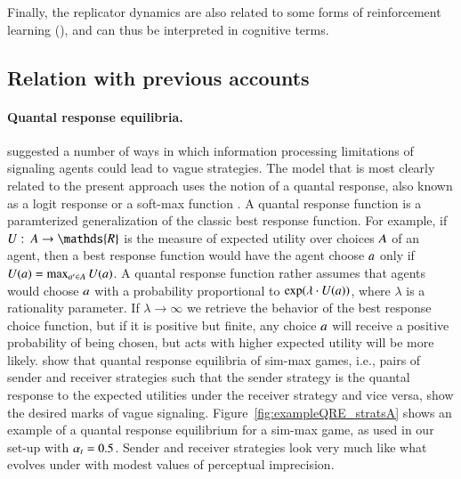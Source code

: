 Finally, the replicator dynamics are also related to some forms of reinforcement learning (\cite{Borgers1997,Hopkins2005,Beggs2005}), and can thus be interpreted in cognitive terms.


\subsection{Relation with previous accounts}

\paragraph{Quantal response equilibria.}
\citet{FrankeJager2010:Vagueness-Signa} suggested a number of ways in
which information processing limitations of signaling agents could
lead to vague strategies. The model that is most clearly related to
the present approach uses the notion of a quantal response, also known
as a logit response or a soft-max function
\citep[e.g.][]{Luce1959:Individual-Choi,McFadden1976:Quantal-Choice-,McKelveyPalfrey1995:Quantal-Respons,McKelveyPalfrey1998:Quantal-Respons,GoereeHolt2008:Quantal-Respons}. A
quantal response function is a paramterized generalization of the
classic best response function. For example, if $U \mycolon \Acts
\rightarrow \mathds{R}$ is the measure of expected utility over
choices $A$ of an agent, then a best response function would have
the agent choose $a$ only if $U(a) = \max_{a' \in A}
U(a)$. A quantal response function rather assumes that agents would
choose $a$ with a probability proportional to $\operatorname{exp}(\lambda \cdot
U(a))$, where $\lambda$ is a rationality parameter. If $\lambda
\rightarrow \infty$ we retrieve the behavior of the best response
choice function, but if it is positive but finite, any choice $a$
will receive a positive probability of being chosen, but acts with
higher expected utility will be more
likely. \citet{FrankeJager2010:Vagueness-Signa} show that quantal
response equilibria of sim-max games, i.e., pairs of sender and
receiver strategies such that the sender strategy is the quantal
response to the expected utilities under the receiver strategy and
vice versa, show the desired marks of vague
signaling. Figure~\ref{fig:exampleQRE_stratsA} shows an example of a
quantal response equilibrium for a sim-max game, as used in our set-up
with $\alpha_t = 0.5$. Sender and receiver strategies look very much
like what evolves under \rdd with modest values of perceptual
imprecision. 

